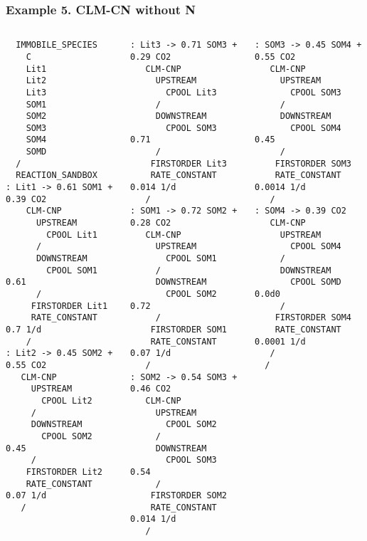 \documentclass{beamer}
\begin{document}
\begin{frame}[fragile]
\frametitle{Example 5. CLM-CN without N}

\tiny
\begin{columns}
\column{1.5in}
\begin{verbatim}
  IMMOBILE_SPECIES
    C
    Lit1
    Lit2
    Lit3
    SOM1
    SOM2
    SOM3
    SOM4
    SOMD
  /
  REACTION_SANDBOX
: Lit1 -> 0.61 SOM1 + 0.39 CO2 
    CLM-CNP
      UPSTREAM
        CPOOL Lit1
      /
      DOWNSTREAM
        CPOOL SOM1 0.61
      /
     FIRSTORDER Lit1
     RATE_CONSTANT 0.7 1/d 
    /
: Lit2 -> 0.45 SOM2 + 0.55 CO2 
   CLM-CNP
     UPSTREAM
       CPOOL Lit2
     /
     DOWNSTREAM
       CPOOL SOM2 0.45
     /
    FIRSTORDER Lit2
    RATE_CONSTANT 0.07 1/d 
   /
\end{verbatim}  
\column{1.5in}
\begin{verbatim}   
: Lit3 -> 0.71 SOM3 + 0.29 CO2 
   CLM-CNP
     UPSTREAM
       CPOOL Lit3
     /
     DOWNSTREAM
       CPOOL SOM3 0.71
     /
    FIRSTORDER Lit3
    RATE_CONSTANT 0.014 1/d 
   /
: SOM1 -> 0.72 SOM2 + 0.28 CO2 
   CLM-CNP
     UPSTREAM
       CPOOL SOM1
     /
     DOWNSTREAM
       CPOOL SOM2 0.72
     /
    FIRSTORDER SOM1
    RATE_CONSTANT 0.07 1/d 
   /
: SOM2 -> 0.54 SOM3 + 0.46 CO2 
   CLM-CNP
     UPSTREAM
       CPOOL SOM2
     /
     DOWNSTREAM
       CPOOL SOM3 0.54
     /
    FIRSTORDER SOM2
    RATE_CONSTANT 0.014 1/d 
   /
\end{verbatim}  
\column{1.5in}
\begin{verbatim}   
: SOM3 -> 0.45 SOM4 + 0.55 CO2 
   CLM-CNP
     UPSTREAM
       CPOOL SOM3
     /
     DOWNSTREAM
       CPOOL SOM4 0.45
     /
    FIRSTORDER SOM3
    RATE_CONSTANT 0.0014 1/d 
   /
: SOM4 -> 0.39 CO2 
   CLM-CNP
     UPSTREAM
       CPOOL SOM4
     /
     DOWNSTREAM
       CPOOL SOMD 0.0d0
     /
    FIRSTORDER SOM4
    RATE_CONSTANT 0.0001 1/d 
   /
  /
\end{verbatim}  
\end{columns}
\end{frame}
\end{document}
